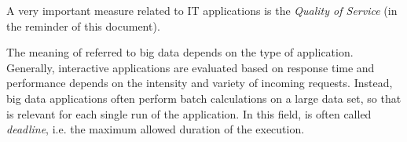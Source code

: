 

A very important measure related to IT applications is the \textit{Quality of Service} (\qos in the reminder of this document).

The meaning of \qos referred to big data depends on the type of application. Generally, interactive applications are evaluated based on response time and performance depends on the intensity and variety of incoming requests. Instead, big data applications often perform batch calculations on a large data set, so that \qos is relevant for each single run of the application. In this field, \qos is often called \textit{deadline}, i.e. the maximum allowed  duration of the execution. %



